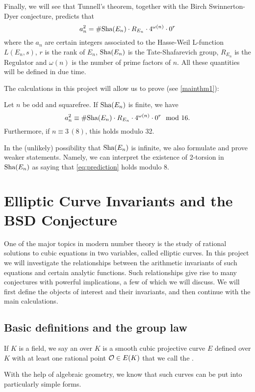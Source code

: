 \documentclass[12pt, a4paper]{report}
\begin{document}
Finally, we will see that Tunnell's theorem, together with the Birch Swinnerton-Dyer
conjecture, predicts that
\begin{equation} \label{eq:prediction}
  a_n^2 = \# \text{\normalfont Sha}(E_n) \cdot R_{E_n} \cdot 4^{\omega(n)} \cdot 0^r
\end{equation}
where the $a_n$ are certain integers associated to the Hasse-Weil L-function
$L(E_n,s)$, $r$ is the rank of $E_n$,
$\text{\normalfont Sha}(E_n)$ is the Tate-Shafarevich group,
$R_{E_n}$ is the Regulator and $\omega(n)$ is the number of prime factors of
$n$. All these quantities will be defined in due time. 

The calculations in this project will allow us to prove (see \autoref{mainthm1}): 
\begin{thm*}
  Let $n$ be odd and squarefree. If $\text{\normalfont Sha}(E_n)$ is finite, we have
  \[a^2_n \equiv \# \text{\normalfont Sha}(E_n) \cdot R_{E_n} \cdot 4^{\omega(n)} \cdot 0^r \mod{16}.\]
  Furthermore, if $n \equiv 3 \, (8)$, this holds modulo 32.
\end{thm*}
In the (unlikely) possibility that $\text{\normalfont Sha}(E_n)$ is infinite, we also formulate
and prove weaker statements. Namely, we can interpret the existence of 2-torsion in
$\text{\normalfont Sha}(E_n)$ as saying that \autoref{eq:prediction} holds modulo 8.


\chapter{Elliptic Curve Invariants and the BSD Conjecture}

One of the major topics in modern number theory is the study of rational
solutions to cubic equations in two variables, called elliptic curves.
In this project we will
investigate the relationships between the arithmetic invariants of such
equations and certain analytic functions. Such relationships give rise to
many conjectures with powerful implications, a few of which we will discuss.
We will first define the objects of interest and their invariants, and then
continue with the main calculations.

\section{Basic definitions and the group law}

\begin{defn}
  If $K$ is a field,
  we say an  over $K$ is a smooth cubic projective
  curve $E$ defined over $K$ with at least one rational point ${\mathcal O} \in E(K)$
  that we call the .
\end{defn}
With the help of algebraic geometry, we know that such curves can be put
into particularly simple forms.
\end{document}
